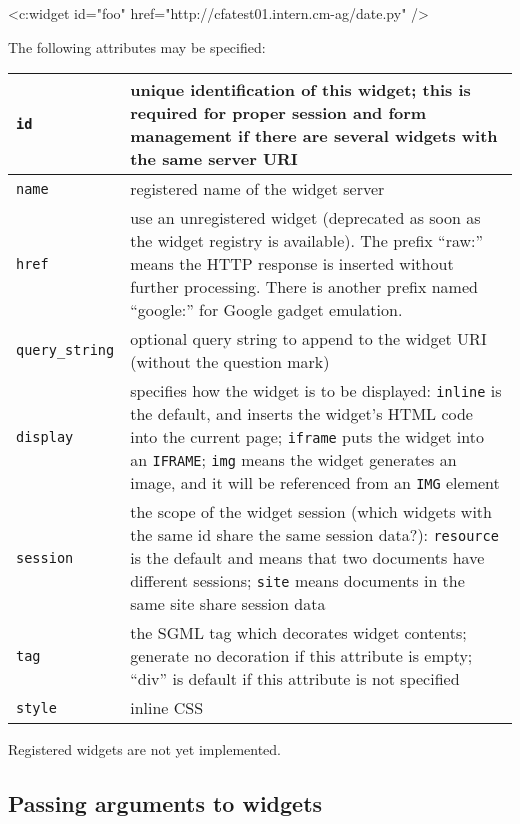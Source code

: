 \documentclass[a4paper,12pt]{article}
\begin{document}
\begin{verbatim*}
<c:widget id="foo" href="http://cfatest01.intern.cm-ag/date.py" />
\end{verbatim*}

The following attributes may be specified:

\begin{tabular}{|l|p{8cm}|}
\hline
\texttt{id} & unique identification of this widget; this is required
for proper session and form management if there are several widgets
with the same server URI \\
\hline
\texttt{name} & registered name of the widget server \\
\hline

\texttt{href} & use an unregistered widget (deprecated as soon as the
widget registry is available).  The prefix ``raw:'' means the HTTP
response is inserted without further processing.  There is another
prefix named ``google:'' for Google gadget emulation. \\

\hline
\texttt{query\_string} & optional query string to append to the widget
URI (without the question mark) \\
\hline
\texttt{display} & specifies how the widget is to be displayed:
\texttt{inline} is the default, and inserts the widget's HTML code
into the current page; \texttt{iframe} puts the widget into an
\texttt{IFRAME}; \texttt{img} means the widget generates an image, and
it will be referenced from an \texttt{IMG} element \\
\hline
\texttt{session} & the scope of the widget session (which widgets with
the same id share the same session data?): \texttt{resource} is the
default and means that two documents have different sessions;
\texttt{site} means documents in the same site share session data \\
\hline

\texttt{tag} & the SGML tag which decorates widget contents; generate
no decoration if this attribute is empty; ``div'' is default if this
attribute is not specified \\

\hline
\texttt{style} & inline CSS \\
\hline
\end{tabular}

Registered widgets are not yet implemented.

\subsection{Passing arguments to widgets}
\end{document}
